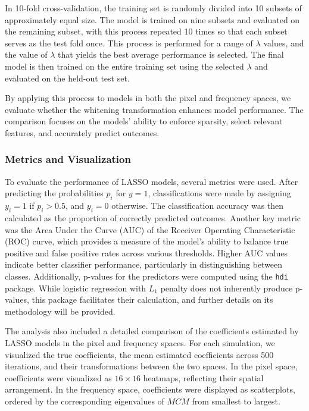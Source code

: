 \documentclass[12pt]{article}
\begin{document}
In 10-fold cross-validation, the training set is randomly divided into 10 subsets of approximately equal size. The model is trained on nine subsets and evaluated on the remaining subset, with this process repeated 10 times so that each subset serves as the test fold once. This process is performed for a range of \( \lambda \) values, and the value of \( \lambda \) that yields the best average performance is selected. The final model is then trained on the entire training set using the selected \( \lambda \) and evaluated on the held-out test set.

By applying this process to models in both the pixel and frequency spaces, we evaluate whether the whitening transformation enhances model performance. The comparison focuses on the models’ ability to enforce sparsity, select relevant features, and accurately predict outcomes.


\subsubsection{Metrics and Visualization}

To evaluate the performance of LASSO models, several metrics were used. After predicting the probabilities \( p_i \) for \( y = 1 \), classifications were made by assigning \( y_i = 1 \) if \( p_i > 0.5 \), and \( y_i = 0 \) otherwise. The classification accuracy was then calculated as the proportion of correctly predicted outcomes. Another key metric was the Area Under the Curve (AUC) of the Receiver Operating Characteristic (ROC) curve, which provides a measure of the model’s ability to balance true positive and false positive rates across various thresholds. Higher AUC values indicate better classifier performance, particularly in distinguishing between classes. Additionally, p-values for the predictors were computed using the \texttt{hdi} package. While logistic regression with \( L_1 \) penalty does not inherently produce p-values, this package facilitates their calculation, and further details on its methodology will be provided.

The analysis also included a detailed comparison of the coefficients estimated by LASSO models in the pixel and frequency spaces. For each simulation, we visualized the true coefficients, the mean estimated coefficients across 500 iterations, and their transformations between the two spaces. In the pixel space, coefficients were visualized as \( 16 \times 16 \) heatmaps, reflecting their spatial arrangement. In the frequency space, coefficients were displayed as scatterplots, ordered by the corresponding eigenvalues of \( MCM \) from smallest to largest.
\end{document}
